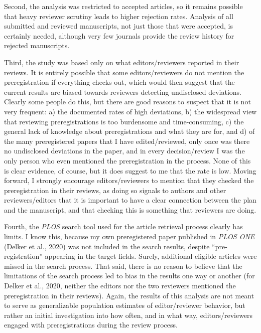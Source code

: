 \documentclass[authordate, meta, issue]{jote-new-article}
\begin{document}
	Second, the analysis was restricted to accepted articles, so it remains possible that heavy reviewer scrutiny leads to higher rejection rates. Analysis of all submitted and reviewed manuscripts, not just those that were accepted, is certainly needed, although very few journals provide the review history for rejected manuscripts.



	Third, the study was based only on what editors/reviewers reported in their reviews. It is entirely possible that some editors/reviewers do not mention the preregistration if everything checks out, which would then suggest that the current results are biased towards reviewers detecting undisclosed deviations. Clearly some people do this, but there are good reasons to suspect that it is not very frequent: a) the documented rates of high deviations, b) the widespread view that reviewing preregistrations is too burdensome and time-consuming, c) the general lack of knowledge about preregistrations and what they are for, and d) of the many preregistered papers that I have edited/reviewed, only once was there no undisclosed deviations in the paper, and in every decision/review I was the only person who even mentioned the preregistration in the process. None of this is clear evidence, of course, but it does suggest to me that the rate is low. Moving forward, I strongly encourage editors/reviewers to mention that they checked the preregistration in their reviews, as doing so signals to authors and other reviewers/editors that it is important to have a clear connection between the plan and the manuscript, and that checking this is something that reviewers are doing.



	Fourth, the \emph{PLOS} search tool used for the article retrieval process clearly has limits. I know this, because my own preregistered paper published in \emph{PLOS ONE} (Delker et al., 2020) was not included in the search results, despite “pre-registration” appearing in the target fields. Surely, additional eligible articles were missed in the search process. That said, there is no reason to believe that the limitations of the search process led to bias in the results one way or another (for Delker et al., 2020, neither the editors nor the two reviewers mentioned the preregistration in their reviews). Again, the results of this analysis are not meant to serve as generalizable population estimates of editor/reviewer behavior, but rather an initial investigation into how often, and in what way, editors/reviewers engaged with preregistrations during the review process.
\end{document}
